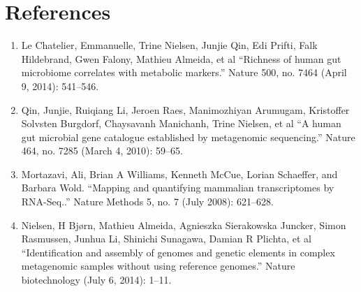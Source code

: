 \documentclass[]{article}
\providecommand{\tightlist}{%
  \setlength{\itemsep}{0pt}\setlength{\parskip}{0pt}}
\begin{document}
\section{References}\label{references}

\begin{enumerate}
\def\labelenumi{\arabic{enumi}.}
\tightlist
\item
  Le Chatelier, Emmanuelle, Trine Nielsen, Junjie Qin, Edi Prifti, Falk
  Hildebrand, Gwen Falony, Mathieu Almeida, et al ``Richness of human
  gut microbiome correlates with metabolic markers.'' Nature 500, no.
  7464 (April 9, 2014): 541--546.\\
\item
  Qin, Junjie, Ruiqiang Li, Jeroen Raes, Manimozhiyan Arumugam,
  Kristoffer Solvsten Burgdorf, Chaysavanh Manichanh, Trine Nielsen, et
  al ``A human gut microbial gene catalogue established by metagenomic
  sequencing.'' Nature 464, no. 7285 (March 4, 2010): 59--65.\\
\item
  Mortazavi, Ali, Brian A Williams, Kenneth McCue, Lorian Schaeffer, and
  Barbara Wold. ``Mapping and quantifying mammalian transcriptomes by
  RNA-Seq..'' Nature Methods 5, no. 7 (July 2008): 621--628.\\
\item
  Nielsen, H Bjørn, Mathieu Almeida, Agnieszka Sierakowska Juncker,
  Simon Rasmussen, Junhua Li, Shinichi Sunagawa, Damian R Plichta, et al
  ``Identification and assembly of genomes and genetic elements in
  complex metagenomic samples without using reference genomes.'' Nature
  biotechnology (July 6, 2014): 1--11.
\end{enumerate}
\end{document}
